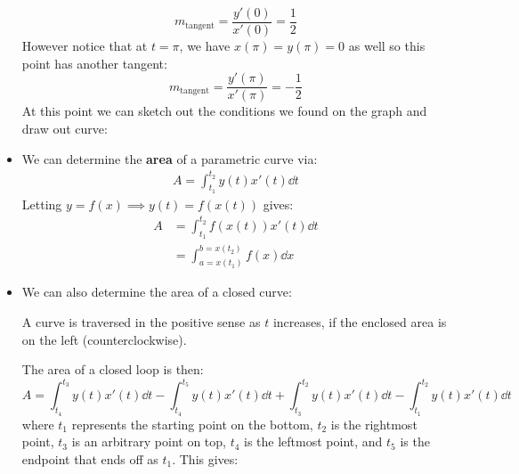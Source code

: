 \begin{itemize}
\begin{example}
        \begin{equation}
            m_\text{tangent} = \frac{y'(0)}{x'(0)} = \frac{1}{2}
        \end{equation}
        However notice that at $t=\pi$, we have $x(\pi)=y(\pi)=0$ as well so this point has another tangent:
        \begin{equation}
            m_\text{tangent} = \frac{y'(\pi)}{x'(\pi)} = -\frac{1}{2}
        \end{equation}
        At this point we can sketch out the conditions we found on the graph and draw out curve:
        \begin{center}
        \end{center}
    \end{example}
    \item We can determine the \textbf{area} of a parametric curve via:
    \begin{align}
        A = \int_{t_1}^{t_2}y(t)x'(t) \dd{t}
    \end{align}
    Letting $y=f(x) \implies y(t) = f(x(t))$ gives:
    \begin{align}
        A &= \int_{t_1}^{t_2} f(x(t))x'(t) \dd{t} \\ 
        &= \int_{a=x(t_1)}^{b=x(t_2)} f(x) \dd{x}
    \end{align}
    \item We can also determine the area of a closed curve:
    \begin{definition}
        A curve is traversed in the positive sense as $t$ increases, if the enclosed area is on the left (counterclockwise).
    \end{definition}
    The area of a closed loop is then:
    \begin{equation}
        A = \int_{t_4}^{t_3}y(t)x'(t)\dd{t} - \int_{t_4}^{t_5}y(t)x'(t)\dd{t} + \int_{t_3}^{t_2}y(t)x'(t)\dd{t} - \int_{t_1}^{t_2}y(t)x'(t)\dd{t}
    \end{equation}
    where $t_1$ represents the starting point on the bottom, $t_2$ is the rightmost point, $t_3$ is an arbitrary point on top, $t_4$ is the leftmost point, and $t_5$ is the endpoint that ends off as $t_1$. This gives:

\end{itemize}
